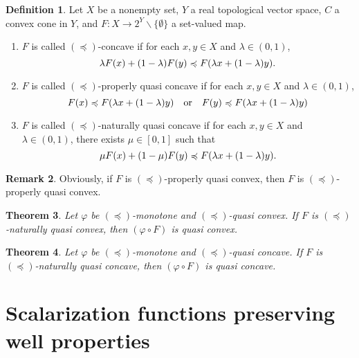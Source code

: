 \documentclass[a4paper,11pt]{jsarticle}
\newtheorem{thm}{Theorem}[section]
\theoremstyle{definition}
\newtheorem{dfn}[thm]{Definition}
\newtheorem{rem}[thm]{Remark}
\begin{document}
\begin{dfn}
  Let $X$ be a nonempty set, $Y$ a real topological vector space, $C$ a convex cone in $Y$, and $F\colon X \to 2^Y \backslash \{\emptyset\}$ a set-valued map.
  \begin{enumerate}
    \item $F$ is called $(\preccurlyeq)$-concave if for each $x,y \in X$ and $\lambda \in (0,1)$,
          \begin{equation}
            \lambda F(x) + (1-\lambda) F(y) \preccurlyeq F(\lambda x + (1-\lambda)y) . \notag
          \end{equation}
    \item $F$ is called $(\preccurlyeq)$-properly quasi concave if for each $x,y \in X$ and $\lambda \in (0,1)$,
          \begin{equation}
            F(x) \preccurlyeq F(\lambda x + (1-\lambda)y) \quad \text{or} \quad F(y) \preccurlyeq F(\lambda x + (1-\lambda)y) \notag
          \end{equation}
    \item $F$ is called $(\preccurlyeq)$-naturally quasi concave if for each $x,y \in X$ and $\lambda \in (0,1)$, there exists $\mu \in [0,1]$ such that
          \begin{equation}
            \mu F(x) + (1-\mu) F(y) \preccurlyeq F(\lambda x + (1-\lambda)y). \notag
          \end{equation}
  \end{enumerate}
\end{dfn}

\begin{rem}
  Obviously, if $F$ is $(\preccurlyeq)$-properly quasi convex, then $F$ is $(\preccurlyeq)$-properly quasi convex.
\end{rem}

\begin{thm}
  Let $\varphi$ be $(\preccurlyeq)$-monotone and $(\preccurlyeq)$-quasi convex. If $F$ is $(\preccurlyeq)$-naturally quasi convex, then $(\varphi \circ F)$ is quasi convex.
\end{thm}

\begin{thm}
  Let $\varphi$ be $(\preccurlyeq)$-monotone and $(\preccurlyeq)$-quasi concave. If $F$ is $(\preccurlyeq)$-naturally quasi concave, then $(\varphi \circ F)$ is quasi concave.
\end{thm}

\section{Scalarization functions preserving well properties}
\end{document}
